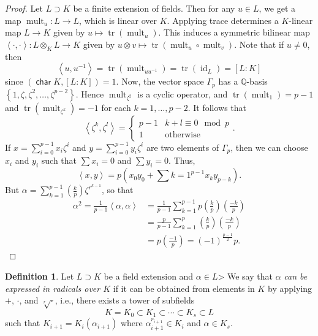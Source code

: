 \documentclass[10pt,letterpaper,cm]{nupset}
\theoremstyle{definition}
\newtheorem{definition}{Definition}[subsection]
\theoremstyle{theorem}
\theoremstyle{remark}
\newcommand{\Q}{\mathbb Q}
\newcommand{\1}{\mathbf{1}}
\newcommand{\0}{\vec 0}
\DeclareMathOperator{\Char}{\mathsf{char}}
\DeclareMathOperator{\id}{id}
\DeclareMathOperator{\tr}{tr}
\DeclareMathOperator{\mult}{mult}
\begin{document}
\begin{proof}
Let $L \supset K$ be a finite extension of fields. Then for any $u\in L$, we get a map $\mult_u : L \to L$, which is linear over $K$. Applying trace determines a $K$-linear map $L \to K$ given by $u \mapsto \tr(\mult_u)$. This induces a symmetric bilinear map $\left\langle \cdot, \cdot \right\rangle : L \otimes_K L \to K$ given by $u \otimes v \mapsto \tr(\mult_u \circ \mult_v)$. Note that if $u \ne 0$, then $$\left\langle u, u^{-1} \right\rangle = \tr(\mult_{uu^{-1}}) = \tr(\id_L) =[L:K] $$ since $\left(\Char{K}, \left[L:K\right]\right)=1$. Now, the vector space $\Gamma_p$ has a $\Q$-basis $\left\{1, \zeta, \zeta^2, \ldots, \zeta^{p-2}\right\}$. Hence $\mult_{\zeta^2}$ is a cyclic operator, and $\tr(\mult_1) = p-1$ and $\tr(\mult_{\zeta^k}) = {-1}$ for each $k=1, \ldots, p-2$. It follows that $$ \left\langle \zeta^k, \zeta^l \right\rangle = \begin{cases}  p-1 & k+l \equiv 0 \mod p \\ 1 & \text{otherwise}   \end{cases}.$$ If $x = \sum_{i=0}^{p-1} x_i \zeta^i$ and $y = \sum_{i=0}^{p-1} y_i \zeta^i$ are two elements of $\Gamma_p$, then we can choose $x_i$ and $y_i$ such that $\sum x_i = 0$ and $\sum y_i= 0$. Thus, $$\left\langle x, y \right\rangle = p(x_0y_0 + \sum{k=1}^{p-1} x_k y_{p-k}).$$ But $\alpha = \sum_{k=1}^{p-1} \left(\frac{k}{p} \right) \zeta^{r^{k-1}}$, so that \begin{align*}
 \alpha^2 = \frac{1}{p-1} \left\langle \alpha, \alpha \right\rangle & = \frac{1}{p-1} \sum_{k=1}^{p-1} p \left(\frac{k}{p} \right) \left(\frac{{-}k}{p} \right) \\ &= \frac{p}{p-1} \sum_{k=1}^{p} \left(\frac{k}{p} \right) \left(\frac{{-}k}{p} \right) \\ & = p \left(\frac{-1}{p} \right) = \left({-1}\right)^{\frac{p-1}{2}}p
. \end{align*}
\end{proof}

\smallskip

\begin{definition}
Let $L \supset K$ be a field extension and $\alpha \in L$> We say that $\alpha$ \textit{can be expressed in radicals over $K$} if it can be obtained from elements in $K$ by applying $+$, $\cdot$, and $\sqrt[r]{\cdot}$, i.e., there exists a tower of subfields $$ K = K_0 \subset K_1 \subset \cdots \subset K_s \subset L  $$ such that $K_{i+1} = K_i(\alpha_{i+1})$ where $\alpha_{i+1}^{r_{i+1}} \in K_i$ and $\alpha \in K_s$. 
\end{definition}
\end{document}
